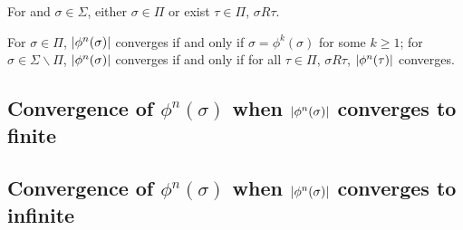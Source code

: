 \begin{lem}
For and $\sigma \in \Sigma$, either $\sigma \in \Pi$ or exist 
$\tau \in \Pi$, $\sigma R \tau$.
\end{lem}

\begin{thm}
For $\sigma \in \Pi$, $\left| {\phi^n(\sigma)} \right|$ converges if and only if
$\sigma = \phi^k(\sigma)$ for some $k \geq 1$;
for $\sigma \in \Sigma \backslash \Pi$, $\left| {\phi^n(\sigma)} \right|$ converges if 
and only if for all $\tau \in \Pi$, $\sigma R \tau$, $\left| {\phi^n(\tau)} \right|$
converges.
\end{thm}

\subsection{Convergence of $\phi^n(\sigma)$ when 
$\left| {\phi^n(\sigma)} \right|$ converges to finite}

\subsection{Convergence of $\phi^n(\sigma)$ when
$\left| {\phi^n(\sigma)} \right|$ converges to infinite}
